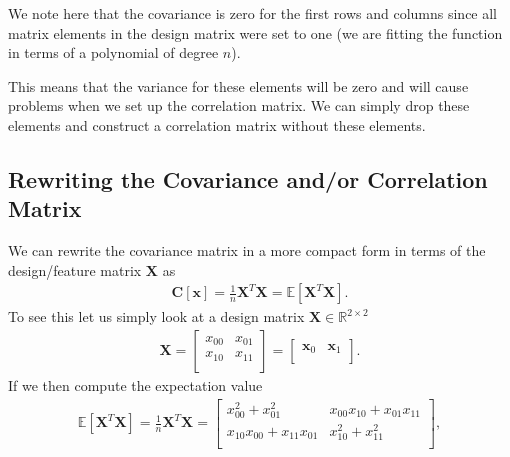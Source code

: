 \documentclass[letterpaper,10pt,english]{sphinxmanual}
\begin{document}
We note here that the covariance is zero for the first rows and
columns since all matrix elements in the design matrix were set to one
(we are fitting the function in terms of a polynomial of degree \(n\)).

This means that the variance for these elements will be zero and will
cause problems when we set up the correlation matrix.  We can simply
drop these elements and construct a correlation
matrix without these elements.


\subsection{Rewriting the Covariance and/or Correlation Matrix}
\label{\detokenize{chapter4:rewriting-the-covariance-and-or-correlation-matrix}}
We can rewrite the covariance matrix in a more compact form in terms of the design/feature matrix \(\boldsymbol{X}\) as
\begin{equation*}
\begin{split}
\boldsymbol{C}[\boldsymbol{x}] = \frac{1}{n}\boldsymbol{X}^T\boldsymbol{X}= \mathbb{E}[\boldsymbol{X}^T\boldsymbol{X}].
\end{split}
\end{equation*}
To see this let us simply look at a design matrix \(\boldsymbol{X}\in {\mathbb{R}}^{2\times 2}\)
\begin{equation*}
\begin{split}
\boldsymbol{X}=\begin{bmatrix}
x_{00} & x_{01}\\
x_{10} & x_{11}\\
\end{bmatrix}=\begin{bmatrix}
\boldsymbol{x}_{0} & \boldsymbol{x}_{1}\\
\end{bmatrix}.
\end{split}
\end{equation*}
If we then compute the expectation value
\begin{equation*}
\begin{split}
\mathbb{E}[\boldsymbol{X}^T\boldsymbol{X}] = \frac{1}{n}\boldsymbol{X}^T\boldsymbol{X}=\begin{bmatrix}
x_{00}^2+x_{01}^2 & x_{00}x_{10}+x_{01}x_{11}\\
x_{10}x_{00}+x_{11}x_{01} & x_{10}^2+x_{11}^2\\
\end{bmatrix},
\end{split}
\end{equation*}
\end{document}
